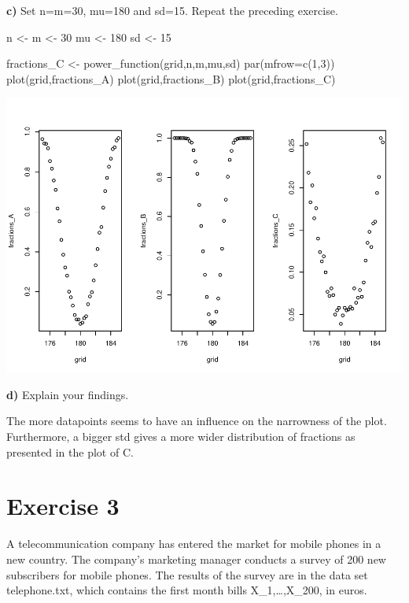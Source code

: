 \documentclass[
]{article}
\newenvironment{Shaded}{\begin{snugshade}}{\end{snugshade}}
\newcommand{\AttributeTok}[1]{\textcolor[rgb]{0.77,0.63,0.00}{#1}}
\newcommand{\DecValTok}[1]{\textcolor[rgb]{0.00,0.00,0.81}{#1}}
\newcommand{\FunctionTok}[1]{\textcolor[rgb]{0.00,0.00,0.00}{#1}}
\newcommand{\NormalTok}[1]{#1}
\newcommand{\OtherTok}[1]{\textcolor[rgb]{0.56,0.35,0.01}{#1}}
\begin{document}
\textbf{c)} Set n=m=30, mu=180 and sd=15. Repeat the preceding exercise.

\begin{Shaded}
\begin{Highlighting}[]
\NormalTok{n }\OtherTok{\textless{}{-}}\NormalTok{ m }\OtherTok{\textless{}{-}} \DecValTok{30}
\NormalTok{mu }\OtherTok{\textless{}{-}} \DecValTok{180}
\NormalTok{sd }\OtherTok{\textless{}{-}} \DecValTok{15}

\NormalTok{fractions\_C }\OtherTok{\textless{}{-}} \FunctionTok{power\_function}\NormalTok{(grid,n,m,mu,sd)}
\FunctionTok{par}\NormalTok{(}\AttributeTok{mfrow=}\FunctionTok{c}\NormalTok{(}\DecValTok{1}\NormalTok{,}\DecValTok{3}\NormalTok{))}
\FunctionTok{plot}\NormalTok{(grid,fractions\_A)}
\FunctionTok{plot}\NormalTok{(grid,fractions\_B)}
\FunctionTok{plot}\NormalTok{(grid,fractions\_C)}
\end{Highlighting}
\end{Shaded}

\includegraphics{Assignment-1_files/figure-latex/unnamed-chunk-6-1.pdf}

\textbf{d)} Explain your findings.

The more datapoints seems to have an influence on the narrowness of the
plot. Furthermore, a bigger std gives a more wider distribution of
fractions as presented in the plot of C.

\hypertarget{exercise-3}{%
\section{Exercise 3}\label{exercise-3}}

A telecommunication company has entered the market for mobile phones in
a new country. The company's marketing manager conducts a survey of 200
new subscribers for mobile phones. The results of the survey are in the
data set telephone.txt, which contains the first month bills
X\_1,\ldots,X\_200, in euros.
\end{document}
